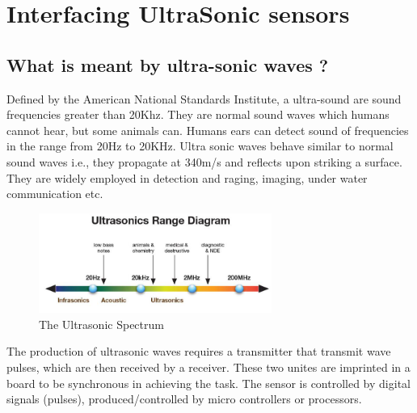 \chapter{Interfacing UltraSonic sensors}
\label{ch:ultrasonic}

\justify
 \section{What is meant by ultra-sonic waves ?}
Defined by the American National Standards Institute, a ultra-sound are sound frequencies greater than 20Khz. They are normal sound waves which humans cannot hear, but some animals can. Humans ears can detect sound of frequencies in the range from 20Hz to 20KHz. Ultra sonic waves behave similar to normal sound waves i.e., they propagate at 340m/s and reflects upon striking a surface. They are widely employed in detection and raging, imaging, under water communication etc.
\hspace{2cm}
\begin{figure}[h!]	
	\centering
	\includegraphics[width=3in]{Chapters/images/ultraSonic_spectrum.png}
	\caption{The Ultrasonic Spectrum}
\end{figure}

 The production of ultrasonic waves requires a transmitter that transmit wave pulses, which are then received by a receiver. These two unites are imprinted in a board to be synchronous in achieving the task. The sensor is controlled by digital signals (pulses), produced/controlled by micro controllers or processors. 

